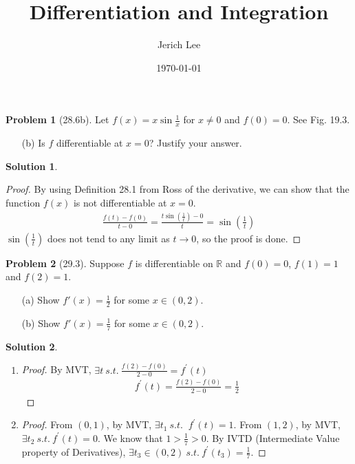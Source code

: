 \documentclass[12pt]{article}
\title{Differentiation and Integration}
\author{Jerich Lee}
\date{\today}
\theoremstyle{definition} %
\newtheorem{solution}{Solution}
\newtheorem{problem}{Problem}
\theoremstyle{plain} %
\begin{document}
\maketitle
\begin{problem}[28.6b]
    Let $ f(x) = x \sin \frac{1}{x} $ for $ x \neq 0 $ and $ f(0) = 0 $. See Fig. 19.3.

\begin{enumerate}
    \item[(b)] Is $ f $ differentiable at $ x = 0 $? Justify your answer.
\end{enumerate}
\end{problem}
\begin{solution}
    \begin{proof}
        By using Definition 28.1 from Ross of the derivative, we can show that the function $f(x)$ is not differentiable at $x=0$. 
   \begin{align}
    \frac{f(t)-f(0)}{t-0} = \frac{t\sin(\frac{1}{t})-0}{t}=\sin \left(  \frac{1}{t}\right) 
   \end{align}
   $\sin(\frac{1}{t})$ does not tend to any limit as $t\to 0$, so the proof is done.  
    \end{proof}
   \end{solution}
\begin{problem}[29.3]
    Suppose $ f $ is differentiable on $ \mathbb{R} $ and $ f(0) = 0 $, $ f(1) = 1 $ and $ f(2) = 1 $.

\begin{enumerate}
    \item[(a)] Show $ f'(x) = \frac{1}{2} $ for some $ x \in (0,2) $.
    \item[(b)] Show $ f'(x) = \frac{1}{7} $ for some $ x \in (0,2) $.
\end{enumerate}
\end{problem}
\begin{solution}
    \noindent
\begin{enumerate}
    \item \begin{proof}
            By MVT, $\exists t \ s.t. \ \frac{f(2)-f(0)}{2-0}=f^\prime (t)$
    \begin{align}
        f^\prime(t)=\frac{f(2)-f(0)}{2-0}=\frac{1}{2}
    \end{align} 
    \end{proof}
    \item \begin{proof}
        From $(0,1)$, by MVT, $\exists t_1 \ s.t. \ $ $f^\prime (t)=1$. From $(1,2)$, by MVT, $\exists t_2 \ s.t. \ f^\prime (t)=0$. We know that $1>\frac{1}{7}>0$. By IVTD (Intermediate Value property of Derivatives), $\exists t_3 \in (0,2) \ s.t. \ f^\prime (t_3)=\frac{1}{7}$.          
    \end{proof}
\end{enumerate}
\end{solution}
\end{document}
